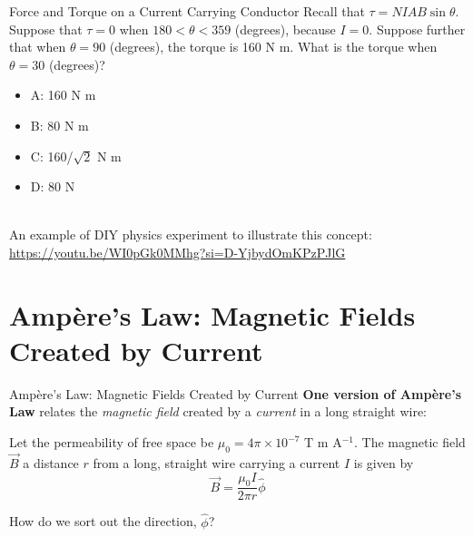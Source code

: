 \documentclass{beamer}
\begin{document}
\begin{frame}{Force and Torque on a Current Carrying Conductor}
Recall that $\tau = N I A B \sin\theta$.  Suppose that $\tau = 0$ when $180 < \theta < 359$ (degrees), because $I = 0$. Suppose further that when $\theta = 90$ (degrees), the torque is 160 N m.  What is the torque when $\theta = 30$ (degrees)?
\begin{itemize}
\item A: 160 N m
\item B: 80 N m
\item C: 160/$\sqrt{2}$ N m
\item D: 80 N
\end{itemize}
\hrulefill \\
\footnotesize
An example of DIY physics experiment to illustrate this concept:
\url{https://youtu.be/WI0pGk0MMhg?si=D-YjbydOmKPzPJlG}
\end{frame}

\section{Amp\`{e}re's Law: Magnetic Fields Created by Current}

\begin{frame}{Amp\`{e}re's Law: Magnetic Fields Created by Current}
\textbf{\alert{One version of Amp\`{e}re's Law}} relates the \textit{magnetic field} created by a \textit{current} in a long straight wire:
\begin{tcolorbox}[colback=white,colframe=gray,title=Amp\`{e}re's Law]
\alert{Let the permeability of free space be $\mu_0 = 4\pi \times 10^{-7}$ T m A$^{-1}$. The magnetic field $\vec{B}$ a distance $r$ from a long, straight wire carrying a current $I$ is given by
\begin{equation}
\vec{B} = \frac{\mu_0 I}{2\pi r} \hat{\phi}
\end{equation}}
\end{tcolorbox}
\footnotesize
How do we sort out the direction, $\hat{\phi}$?
\end{frame}
\end{document}
